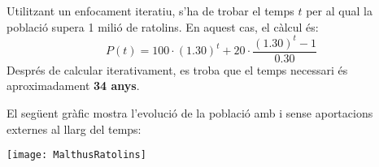 Utilitzant un enfocament iteratiu, s'ha de trobar el temps $t$ per al qual la població supera 1 milió de ratolins. En aquest cas, el càlcul és:
\[
P(t) = 100 \cdot (1.30)^t + 20 \cdot \frac{(1.30)^t - 1}{0.30}
\]
Després de calcular iterativament, es troba que el temps necessari és aproximadament \textbf{34 anys}.


El següent gràfic mostra l'evolució de la població amb i sense aportacions externes al llarg del temps:

\begin{minipage}[t]{\linewidth}
  \vspace{-2ex}
  \texttt{[image: MalthusRatolins]}
  \label{fig:MalthusRatolins}
\end{minipage}


\blacksquare 
